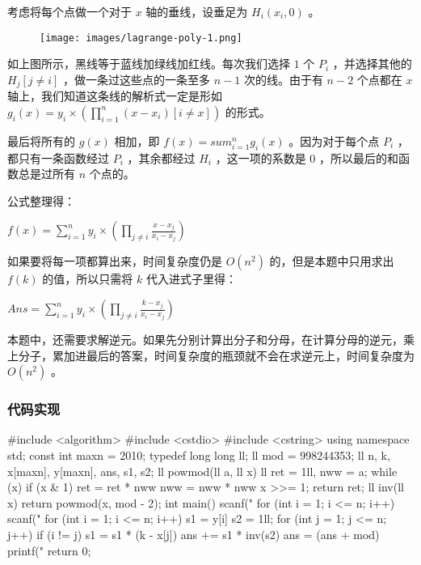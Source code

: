 考虑将每个点做一个对于 $x$ 轴的垂线，设垂足为 $H_i(x_i,0)$ 。

\begin{figure}[h]
\centering
\texttt{[image: images/lagrange-poly-1.png]} 

\end{figure}

如上图所示，黑线等于蓝线加绿线加红线。每次我们选择 $1$ 个 $P_i$ ，并选择其他的 $H_j[j\neq i]$ ，做一条过这些点的一条至多 $n-1$ 次的线。由于有 $n-2$ 个点都在 $x$ 轴上，我们知道这条线的解析式一定是形如 $g_i(x)=y_i\times (\prod_{i=1}^{n} (x-x_i)[i\neq x])$ 的形式。

最后将所有的 $g(x)$ 相加，即 $f(x)=sum_{i=1}^{n}g_i(x)$ 。因为对于每个点 $P_i$ ，都只有一条函数经过 $P_i$ ，其余都经过 $H_i$ ，这一项的系数是 $0$ ，所以最后的和函数总是过所有 $n$ 个点的。

公式整理得：

$f(x)=\sum_{i=1}^{n} y_i\times(\prod_{j\neq i }\frac{x-x_j}{x_i-x_j})$

如果要将每一项都算出来，时间复杂度仍是 $O(n^2)$ 的，但是本题中只用求出 $f(k)$ 的值，所以只需将 $k$ 代入进式子里得：

$Ans=\sum_{i=1}^{n} y_i\times(\prod_{j\neq i }\frac{k-x_j}{x_i-x_j})$

本题中，还需要求解逆元。如果先分别计算出分子和分母，在计算分母的逆元，乘上分子，累加进最后的答案，时间复杂度的瓶颈就不会在求逆元上，时间复杂度为 $O(n^2)$ 。

\subsubsection{代码实现}

\begin{cppcode}
#include <algorithm>
#include <cstdio>
#include <cstring>
using namespace std;
const int maxn = 2010;
typedef long long ll;
ll mod = 998244353;
ll n, k, x[maxn], y[maxn], ans, s1, s2;
ll powmod(ll a, ll x) {
  ll ret = 1ll, nww = a;
  while (x) {
    if (x & 1) ret = ret * nww %
    nww = nww * nww %
    x >>= 1;
  }
  return ret;
}
ll inv(ll x) { return powmod(x, mod - 2); }
int main() {
  scanf("%
  for (int i = 1; i <= n; i++) scanf("%
  for (int i = 1; i <= n; i++) {
    s1 = y[i] %
    s2 = 1ll;
    for (int j = 1; j <= n; j++)
      if (i != j)
        s1 = s1 * (k - x[j]) %
    ans += s1 * inv(s2) %
    ans = (ans + mod) %
  }
  printf("%
  return 0;
}
\end{cppcode}
